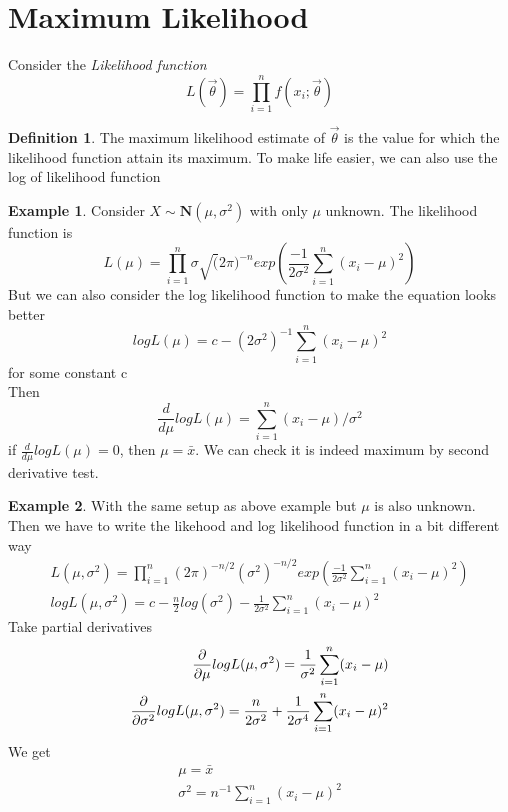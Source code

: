 \documentclass{article}
\theoremstyle{definition}
\newtheorem{definition}{Definition}[section]
\newtheorem{example}{Example}
\begin{document}
\section{Maximum Likelihood}
Consider the \textit{Likelihood function} 
\begin{equation*}
	L(\vec{\theta}) = \prod_{i=1}^{n} f(x_i;\vec{\theta})
\end{equation*}
\begin{definition}
	The maximum likelihood estimate of $\vec{\theta}$ is the value for which the likelihood function attain its maximum. To make life easier, we can also use the log of likelihood function
	
\end{definition}
\begin{example}
	Consider $X \sim \mathbf{N}(\mu,\sigma^2)$ with only $\mu$ unknown. The likelihood function is 
	\begin{equation}
		L(\mu) = \prod_{i=1}^{n}\sigma\sqrt(2\pi)^{-n}exp(\frac{-1}{2\sigma^2}\sum_{i=1}^{n}(x_i - \mu)^2)
	\end{equation}
	But we can also consider the log likelihood function to make the equation looks better
	\begin{equation*}
		logL(\mu) = c - (2\sigma^2)^{-1}\sum_{i=1}^{n}(x_i - \mu)^2
	\end{equation*}
	for some constant c \\
	Then \\
	\begin{equation*}
		\frac{d}{d\mu}logL(\mu) = \sum_{i=1}^{n}(x_i - \mu)/\sigma^2
	\end{equation*}
if $\frac{d}{d\mu}logL(\mu) = 0$, then $\mu = \bar{x}$. We can check it is indeed maximum by second derivative test.
\end{example}
\begin{example}
	With the same setup as above example but $\mu$ is also unknown. \\
	Then we have to write the likehood and log likelihood function in a bit different way
	\begin{align*}
		L(\mu,\sigma^2)=\prod_{i=1}^{n} (2\pi)^{-n/2}(\sigma^2)^{-n/2}exp(\frac{-1}{2\sigma^2}\sum_{i=1}^{n}(x_i - \mu)^2) \\
		logL(\mu,\sigma^2) = c - \frac{n}{2}log(\sigma^2) - \frac{1}{2\sigma^2}\sum_{i=1}^{n} (x_i - \mu)^2
	\end{align*}
	Take partial derivatives
	\begin{align*}
		\pdv{}{\mu}logL(\mu,\sigma^2) = \frac{1}{\sigma^2}\sum_{i=1}^{n}(x_i - \mu) \\
		\pdv{}{\sigma^2}logL(\mu,\sigma^2) = \frac{n}{2\sigma^2} + \frac{1}{2\sigma^4}\sum_{i=1}^{n} (x_i - \mu)^2
	\end{align*}
	We get 
	\begin{align*}
		\mu = \bar{x} \\
	\sigma^2 = n^{-1}\sum_{i=1}^{n}(x_i - \mu)^2
	\end{align*}
\end{example}
\end{document}
